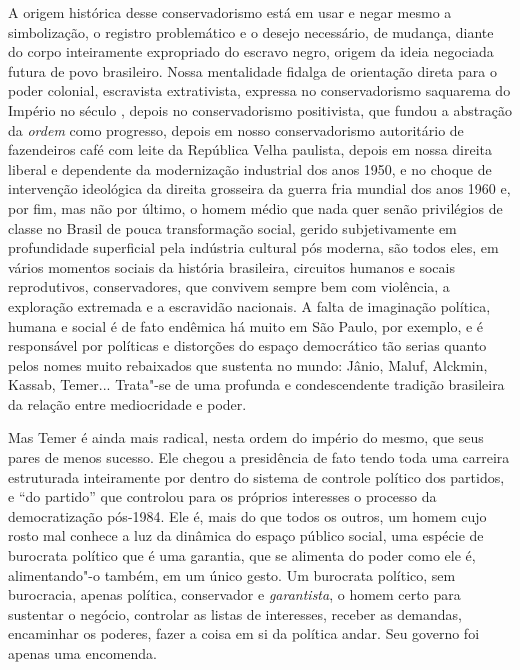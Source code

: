 A origem histórica desse conservadorismo está em usar e negar mesmo a
simbolização, o registro problemático e o desejo necessário, de mudança,
diante do corpo inteiramente expropriado do escravo negro, origem da
ideia negociada futura de povo brasileiro. Nossa mentalidade fidalga de
orientação direta para o poder colonial, escravista extrativista,
expressa no conservadorismo saquarema do Império no século , depois
no conservadorismo positivista, que fundou a abstração da \emph{ordem}
como progresso, depois em nosso conservadorismo autoritário de
fazendeiros café com leite da República Velha paulista, depois em nossa
direita liberal e dependente da modernização industrial dos anos 1950, e
no choque de intervenção ideológica da direita grosseira da guerra fria
mundial dos anos 1960 e, por fim, mas não por último, o homem médio que
nada quer senão privilégios de classe no Brasil de pouca transformação
social, gerido subjetivamente em profundidade superficial pela indústria
cultural pós moderna, são todos eles, em vários momentos sociais da
história brasileira, circuitos humanos e socais reprodutivos,
conservadores, que convivem sempre bem com violência, a exploração
extremada e a escravidão nacionais. A falta de imaginação política,
humana e social é de fato endêmica há muito em São Paulo, por exemplo, e
é responsável por políticas e distorções do espaço democrático tão
serias quanto pelos nomes muito rebaixados que sustenta no mundo: Jânio,
Maluf, Alckmin, Kassab, Temer... Trata"-se de uma profunda e
condescendente tradição brasileira da relação entre mediocridade e
poder.

Mas Temer é ainda mais radical, nesta ordem do império do mesmo, que
seus pares de menos sucesso. Ele chegou a presidência de fato tendo toda
uma carreira estruturada inteiramente por dentro do sistema de controle
político dos partidos, e ``do partido'' que controlou para os próprios
interesses o processo da democratização pós-1984. Ele é, mais do que
todos os outros, um homem cujo rosto mal conhece a luz da dinâmica do
espaço público social, uma espécie de burocrata político que é uma
garantia, que se alimenta do poder como ele é, alimentando"-o também, em
um único gesto. Um burocrata político, sem burocracia, apenas política,
conservador e \emph{garantista}, o homem certo para sustentar o negócio,
controlar as listas de interesses, receber as demandas, encaminhar os
poderes, fazer a coisa em si da política andar. Seu governo foi apenas
uma encomenda.


